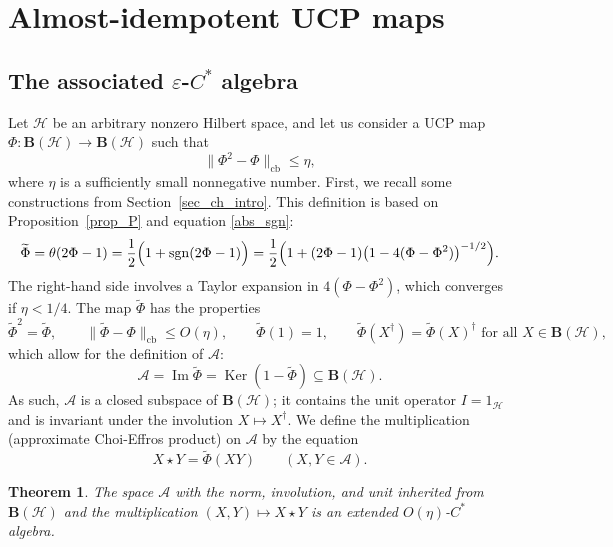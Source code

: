 \documentclass[12pt]{article}
\newcommand{\calA}{\mathcal{A}}
\newcommand{\calH}{\mathcal{H}}
\DeclareMathOperator{\Ker}{Ker}
\DeclareMathOperator{\Img}{Im}
\DeclareMathOperator{\sgn}{sgn}
\newcommand{\cb}{\mathrm{cb}}
\newcommand{\Bo}{\mathbf{B}}
\newcommand{\wt}{\widetilde}
\newcommand{\eps}{\varepsilon}
\renewcommand{\le}{\leqslant}
\newtheorem{Theorem}{Theorem}[section]
\newtheorem[definition]{Definition}[Theorem]{Definition}
\newtheorem[remark]{Example}[Theorem]{Example}
\newtheorem[remark]{Remark}[Theorem]{Remark}
\newtheorem[remark]{Question}[Theorem]{Open question}
\newtheorem*[definition]{definition}{Definition}
\newtheorem*[remark]{example}{Example}
\newtheorem*[remark]{remark}{Remark}
\newtheorem*[remark]{question}{Open question}
\numberwithin{equation}{section}
\begin{document}
\section{Almost-idempotent UCP maps}\label{sec_almost_idemp}

\subsection{The associated \texorpdfstring{$\eps$-$C^*$}{epsilon-C*} algebra}\label{sec_assoc_ecsa}

Let $\calH$ be an arbitrary nonzero Hilbert space, and let us consider a UCP map $\Phi\colon\Bo(\calH)\to\Bo(\calH)$ such that
\begin{equation}
\|\Phi^2-\Phi\|_\cb\le\eta,
\end{equation}
where $\eta$ is a sufficiently small nonnegative number. First, we recall some constructions from Section~\ref{sec_ch_intro}. This definition is based on Proposition~\ref{prop_P} and equation \eqref{abs_sgn}:
\begin{equation}\label{tilde_Phi}
\wt{\Phi}=\theta(2\Phi-1)
=\frac{1}{2}\Bigl(1+\sgn(2\Phi-1)\Bigr)
=\frac{1}{2}\Bigl(1+(2\Phi-1)\bigl(1-4(\Phi-\Phi^2)\bigr)^{-1/2}\Bigr).
\end{equation}
The right-hand side involves a Taylor expansion in $4(\Phi-\Phi^2)$, which converges if $\eta<1/4$. The map $\wt{\Phi}$ has the properties
\begin{equation}
\wt{\Phi}^2=\wt{\Phi},\qquad
\|\wt{\Phi}-\Phi\|_\cb\le O(\eta),\qquad
\wt{\Phi}(1)=1,\qquad
\wt{\Phi}(X^\dag)=\wt{\Phi}(X)^\dag\text{ for all }X\in\Bo(\calH),
\end{equation}
which allow for the definition of $\calA$:
\begin{equation}
\calA=\Img\wt{\Phi}=\Ker(1-\wt{\Phi})\subseteq\Bo(\calH).
\end{equation}
As such, $\calA$ is a closed subspace of $\Bo(\calH)$; it contains the unit operator $I=1_\calH$ and is invariant under the involution $X\mapsto X^\dag$. We define the multiplication (approximate Choi-Effros product) on $\calA$ by the equation
\begin{equation}\label{Choi-Effros}
X\star Y=\wt{\Phi}(XY)\qquad (X,Y\in\calA).
\end{equation}

\begin{Theorem}\label{th_almost_idemp}
The space $\calA$ with the norm, involution, and unit inherited from $\Bo(\calH)$ and the multiplication $(X,Y)\mapsto X\star Y$ is an extended $O(\eta)$-$C^*$ algebra.
\end{Theorem}
\end{document}
